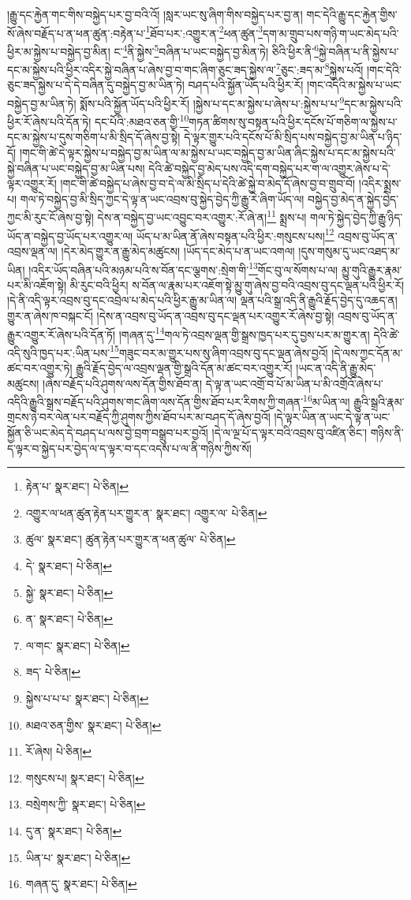 །རྒྱུ་དང་རྐྱེན་གང་གིས་བསྐྱེད་པར་བྱ་བའི་འོ། །སླར་ཡང་སུ་ཞིག་གིས་བསྐྱེད་པར་བྱ་ན། གང་དེའི་རྒྱུ་དང་རྐྱེན་གྱིས་སོ་ཞེས་བརྗོད་པ་ན་ཕན་ཚུན་:བརྟེན་པ་\footnote{རྟེན་པ་  སྣར་ཐང་།  པེ་ཅིན། }ཐོབ་པར་:འགྱུར་ན་\footnote{འགྱུར་ལ་ཕན་ཚུན་རྟེན་པར་གྱུར་ན་  སྣར་ཐང་། འགྱུར་ལ་  པེ་ཅིན། }ཕན་ཚུན་\footnote{ཚུལ་  སྣར་ཐང་། ཚུན་རྟེན་པར་གྱུར་ན་ཕན་ཚུལ་  པེ་ཅིན། }དག་མ་གྲུབ་པས་གཉི་ག་ཡང་མེད་པའི་ཕྱིར་མ་སྐྱེས་པ་བསྐྱེད་བྱ་མིན། ང་\footnote{དེ་  སྣར་ཐང་།  པེ་ཅིན། }ནི་སྐྱེས་\footnote{སྐྱེ་  སྣར་ཐང་།  པེ་ཅིན། }བཞིན་པ་ཡང་བསྐྱེད་བྱ་མིན་ཏེ། ཅིའི་ཕྱིར་ནི་\footnote{ན་  སྣར་ཐང་།  པེ་ཅིན། }སྐྱེ་བཞིན་པ་ནི་སྐྱེས་པ་དང་མ་སྐྱེས་པའི་ཕྱིར་འདིར་སྐྱེ་བཞིན་པ་ཞེས་བྱ་བ་གང་ཞིག་ཅུང་ཟད་སྐྱེས་ལ་\footnote{ལ་གང་  སྣར་ཐང་།  པེ་ཅིན། }ཅུང་:ཟད་མ་\footnote{ཟད་  པེ་ཅིན། }སྐྱེས་པའོ། །གང་དེའི་ཅུང་ཟད་སྐྱེས་པ་དེ་དེ་བཞིན་དུ་བསྐྱེད་བྱ་མ་ཡིན་ཏེ། བཤད་པའི་སྐྱོན་ཡོད་པའི་ཕྱིར་རོ། །གང་འདིའི་མ་སྐྱེས་པ་ཡང་བསྐྱེད་བྱ་མ་ཡིན་ཏེ། སྨོས་པའི་སྐྱོན་ཡོད་པའི་ཕྱིར་རོ། །སྐྱེས་པ་དང་མ་སྐྱེས་པ་ཞེས་པ་:སྐྱེས་པ་པ་\footnote{སྐྱེས་པ་པ་པ་  སྣར་ཐང་།  པེ་ཅིན། }དང་མ་སྐྱེས་པའི་ཕྱིར་རོ་ཞེས་པའི་དོན་ཏེ། དང་པོའི་:མཐའ་ཅན་གྱི་\footnote{མཐའ་ཅན་གྱིས་  སྣར་ཐང་།  པེ་ཅིན། }གཏན་ཚིགས་སུ་བསྟན་པའི་ཕྱིར་དངོས་པོ་གཅིག་ལ་སྐྱེས་པ་དང་མ་སྐྱེས་པ་དུས་གཅིག་པ་མི་སྲིད་དོ་ཞེས་བྱ་སྟེ། དེ་ལྟར་གྱུར་པའི་དངོས་པོ་མི་སྲིད་པས་བསྐྱེད་བྱ་མ་ཡིན་པ་ཉིད་དོ། །གང་གི་ཚེ་དེ་ལྟར་སྐྱེས་པ་བསྐྱེད་བྱ་མ་ཡིན་ལ་མ་སྐྱེས་པ་ཡང་བསྐྱེད་བྱ་མ་ཡིན་ཞིང་སྐྱེས་པ་དང་མ་སྐྱེས་པའི་སྐྱེ་བཞིན་པ་ཡང་བསྐྱེད་བྱ་མ་ཡིན་པས། དེའི་ཚེ་བསྐྱེད་བྱ་མེད་པས་འདི་དག་བསྐྱེད་པར་ག་ལ་འགྱུར་ཞེས་པ་དེ་ལྟར་འགྱུར་རོ། །གང་གི་ཚེ་བསྐྱེད་པ་ཞེས་བྱ་བ་དེ་ལ་མི་སྲིད་པ་དེའི་ཚེ་སྐྱེ་བ་མེད་དོ་ཞེས་བྱ་བ་གྲུབ་བོ། །འདིར་སྨྲས་པ། གལ་ཏེ་བསྐྱེད་བྱ་མི་སྲིད་ཀྱང་དེ་ལྟ་ན་ཡང་འབྲས་བུ་སྐྱེད་བྱེད་ཀྱི་རྒྱུ་རེ་ཞིག་ཡོད་ལ། བསྐྱེད་བྱ་མེད་ན་སྐྱེད་བྱེད་ཀྱང་མི་རུང་ངོ་ཞེས་བྱ་སྟེ། དེས་ན་བསྐྱེད་བྱ་ཡང་འབྱུང་བར་འགྱུར་:རོ་ཞེ་ན།\footnote{རོ་ཞེས།  པེ་ཅིན། } སྨྲས་པ། གལ་ཏེ་སྐྱེད་བྱེད་ཀྱི་རྒྱུ་ཉིད་ཡོད་ན་བསྐྱེད་བྱ་ཡོད་པར་འགྱུར་ལ། ཡོད་པ་མ་ཡིན་ནོ་ཞེས་བསྟན་པའི་ཕྱིར་:གསུངས་པས།\footnote{གསུངས་པ།  སྣར་ཐང་།  པེ་ཅིན། } འབྲས་བུ་ཡོད་ན་འབྲས་ལྡན་ལ། །དེར་མེད་གྱུར་ན་རྒྱུ་མེད་མཚུངས། །ཡོད་དང་མེད་པ་ན་ཡང་འགལ། །དུས་གསུམ་དུ་ཡང་འཐད་མ་ཡིན། །འདིར་ཡོད་བཞིན་པའི་མཉམ་པའི་ས་བོན་དང་ལྕགས་:སྲེག་གི་\footnote{བསྲེགས་ཀྱི་  སྣར་ཐང་།  པེ་ཅིན། }གོང་བུ་ལ་སོགས་པ་ལ། མྱུ་གུའི་རྒྱུར་རྣམ་པར་མི་འཇོག་སྟེ། མི་རུང་བའི་ཕྱིར། ས་བོན་ལ་རྣམ་པར་འཇོག་སྟེ་མྱུ་གུ་ཞེས་བྱ་བའི་འབྲས་བུ་དང་ལྡན་པའི་ཕྱིར་རོ། །དེ་ནི་འདི་ལྟར་འབྲས་བུ་དང་འབྲེལ་པ་མེད་པའི་ཕྱིར་རྒྱུ་མ་ཡིན་ལ། ལྡན་པའི་སྒྲ་འདི་ནི་རྒྱུའི་རྗོད་བྱེད་དུ་འཆད་ན། གྱུར་ན་ཞེས་ཁ་བསྐང་ངོ། །དེས་ན་འབྲས་བུ་ཡོད་ན་འབྲས་བུ་དང་ལྡན་པར་འགྱུར་རོ་ཞེས་བྱ་སྟེ། འབྲས་བུ་ཡོད་ན་རྒྱུར་འགྱུར་རོ་ཞེས་པའི་དོན་ཏོ། །གཞན་དུ་\footnote{དུ་ན་  སྣར་ཐང་།  པེ་ཅིན། }གལ་ཏེ་འབྲས་ལྡན་གྱི་སྒྲས་ཁྱད་པར་དུ་བྱས་པར་མ་གྱུར་ན། དེའི་ཚེ་འདི་སུའི་ཁྱད་པར་:ཡིན་པས་\footnote{ཡིན་པ་  སྣར་ཐང་།  པེ་ཅིན། }གཟུང་བར་མ་གྱུར་པས་སུ་ཞིག་འབྲས་བུ་དང་ལྡན་ཞེས་བྱའོ། །དེ་ལས་ཀྱང་དོན་མ་ཚང་བར་འགྱུར་ཏེ། རྒྱུའི་རྗོད་བྱེད་ལ་འབྲས་ལྡན་གྱི་སྒྲའི་དོན་མ་ཚང་བར་འགྱུར་རོ། །ཡང་ན་འདི་ནི་རྒྱུ་མེད་མཚུངས། །ཞེས་བརྗོད་པའི་ཤུགས་ལས་དོན་གྱིས་ཐོབ་ན། དེ་ལྟ་ན་ཡང་འགྲོ་བ་པོ་མ་ཡིན་པ་མི་འགྲོའོ་ཞེས་པ་འདིའི་རྒྱུའི་སྒྲས་བརྗོད་པའི་ཤུགས་གང་ཞིག་ལས་དོན་གྱིས་ཐོབ་པར་རིགས་ཀྱི་གཞན་\footnote{གཞན་དུ་  སྣར་ཐང་།  པེ་ཅིན། }མ་ཡིན་ལ། རྒྱུའི་སྒྲའི་རྣམ་གྲངས་ཉེ་བར་ལེན་པར་བརྗོད་ཀྱི་ཤུགས་ཀྱིས་ཐོབ་པར་མ་བཤད་དོ་ཞེས་བྱའོ། །དེ་ལྟར་ཡིན་ན་ཡང་དེ་ལྟ་ན་ཡང་སྐྱོན་ཅི་ཡང་མེད་དེ་བཤད་པ་ལས་བྱེ་བྲག་བསྒྲུབ་པར་བྱའོ། །དེ་ལ་ལྔ་པོ་ད་ལྟར་བའི་འབྲས་བུ་འཛིན་ཅིང་། གཉིས་ནི་ད་ལྟར་བ་སྐྱེད་པར་བྱེད་ལ་ད་ལྟར་བ་དང་འདས་པ་ལ་ནི་གཉིས་ཀྱིས་སོ། 